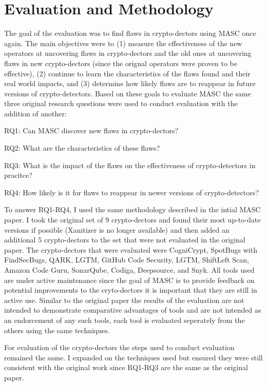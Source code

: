 \chapter{Evaluation and Methodology}
\label{chap_evaluation}

The goal of the evaluation was to find flaws in crypto-dectors using MASC once again. The main objectives were to (1) measure the effectiveness of the new operators at uncovering flaws in crypto-dectors and the old ones at uncovering flaws in new crypto-dectors (since the orignal operators were proven to be effective), (2) continue to learn the characteristics of the flaws found and their real world impacts, and (3) determine how likely flaws are to reappear in future versions of crypto-detectors. Based on these goals to evaluate MASC the same three original research questions were used to conduct evaluation with the addition of another:

RQ1: Can MASC discover new flaws in crypto-dectors?

RQ2: What are the characteristics of these flaws?

RQ3: What is the impact of the flaws on the effectiveness of crypto-detectors in pracitce?

RQ4: How likely is it for flaws to reappear in newer versions of crypto-detectors?

To answer RQ1-RQ4, I used the same methodology described in the intial MASC paper. I took the original set of 9 crypto-dectors and found their most up-to-date versions if possible (Xanitizer is no longer available) and then added an additional 5 crypto-dectors to the set that were not evaluated in the original paper. The crypto-dectors that were evaluated were CogniCrypt, SpotBugs with FindSecBugs, QARK, LGTM, GitHub Code Security, LGTM, ShiftLeft Scan, Amazon Code Guru, SonarQube, Codiga, Deepsource, and Snyk. All tools used are under active maintenance since the goal of MASC is to provide feedback on potential improvements to the cryto-dectors it is important that they are still in active use. Similar to the original paper the results of the evaluation are not intended to demonstrate comparative advantages of tools and are not intended as an endorcement of any such tools, each tool is evaluated seperately from the others using the same techniques.

For evaluation of the crypto-dectors the steps used to conduct evaluation remained the same. I expanded on the techniques used but ensured they were still consistent with the original work since RQ1-RQ3 are the same as the original paper.

